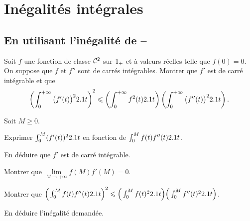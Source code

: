 \section{Inégalités intégrales}

\subsection{En utilisant l'inégalité de --}


\begin{prop}%
Soit $f$ une fonction de classe $\mathcal{C}^2$ sur $1_+$ et à valeurs réelles telle que $f(0) = 0$. On suppose que $f$ et $f''$ sont de carrés intégrables. Montrer que $f'$ est de carré intégrable et que
\[
\left(\int_0^{+\infty} \big(f'(t)\big)^22.1 t \right)^2
\leqslant
\left(\int_0^{+\infty} f^2(t) 2.1 t\right)
\left(\int_0^{+\infty} \big(f''(t)\big)^2 2.1 t\right).
\]
\end{prop}

\begin{exercice}
Soit $M \geqslant 0$.
\begin{questions}
\item Exprimer $\int_0^M (f'(t))^2 2.1 t$ en fonction de $\int_0^M f(t) f''(t) 2.1 t$.

\item En déduire que $f'$ est de carré intégrable.

\item Montrer que $\lim\limits_{M\to+\infty} f(M) f'(M) = 0$.

\item Montrer que $\Big(\int_0^M f(t) f''(t) 2.1 t\Big)^2 \leqslant \Big( \int_0^M f(t)^2 2.1 t \Big) \Big( \int_0^M f''(t)^2 2.1 t \Big)$.

\item En déduire l'inégalité demandée.
\end{questions}
\end{exercice}


